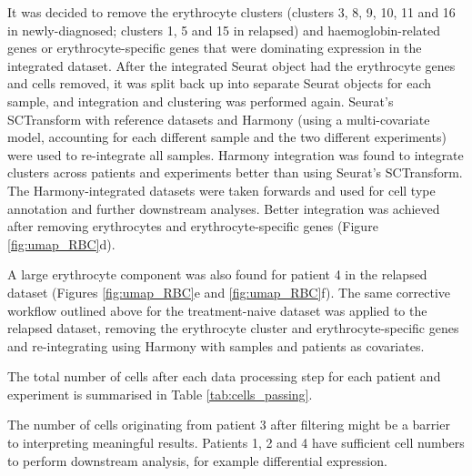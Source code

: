 It was decided to remove the erythrocyte clusters (clusters 3, 8, 9, 10, 11 and 16 in newly-diagnosed; clusters 1, 5 and 15 in relapsed) and haemoglobin-related genes or erythrocyte-specific genes that were dominating expression in the integrated dataset.
After the integrated Seurat object had the erythrocyte genes and cells removed, it was split back up into separate Seurat objects for each sample, and integration and clustering was performed again.
Seurat's SCTransform with reference datasets and Harmony (using a multi-covariate model, accounting for each different sample and the two different experiments) were used to re-integrate all samples.
Harmony integration was found to integrate clusters across patients and experiments better than using Seurat's SCTransform.
The Harmony-integrated datasets were taken forwards and used for cell type annotation and further downstream analyses.
Better integration was achieved after removing erythrocytes and erythrocyte-specific genes (Figure \ref{fig:umap_RBC}d).

A large erythrocyte component was also found for patient 4 in the relapsed dataset (Figures \ref{fig:umap_RBC}e and \ref{fig:umap_RBC}f).
The same corrective workflow outlined above for the treatment-naive dataset was applied to the relapsed dataset, removing the erythrocyte cluster and erythrocyte-specific genes and re-integrating using Harmony with samples and patients as covariates.

The total number of cells after each data processing step for each patient and experiment is summarised in Table \ref{tab:cells_passing}.

The number of cells originating from patient 3 after filtering might be a barrier to interpreting meaningful results.
Patients 1, 2 and 4 have sufficient cell numbers to perform downstream analysis, for example differential expression.

